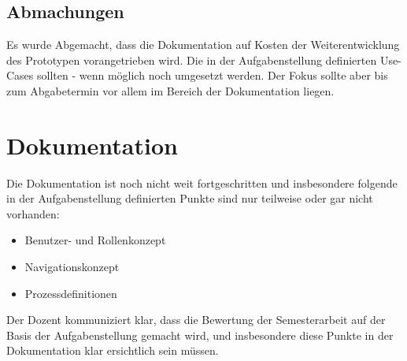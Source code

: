 \subsection{Abmachungen}
Es wurde Abgemacht, dass die Dokumentation auf Kosten der Weiterentwicklung des Prototypen vorangetrieben wird. Die in der Aufgabenstellung definierten Use-Cases sollten - wenn m\"oglich noch umgesetzt werden. Der Fokus sollte aber bis zum Abgabetermin vor allem im Bereich der Dokumentation liegen.

\section{Dokumentation}
Die Dokumentation ist noch nicht weit fortgeschritten und insbesondere folgende in der Aufgabenstellung definierten Punkte sind nur teilweise oder gar nicht vorhanden:
\begin{itemize}
\item Benutzer- und Rollenkonzept
\item Navigationskonzept
\item Prozessdefinitionen
\end{itemize}

Der Dozent kommuniziert klar, dass die Bewertung der Semesterarbeit auf der Basis der Aufgabenstellung gemacht wird, und insbesondere diese Punkte in der Dokumentation klar ersichtlich sein m\"ussen.


